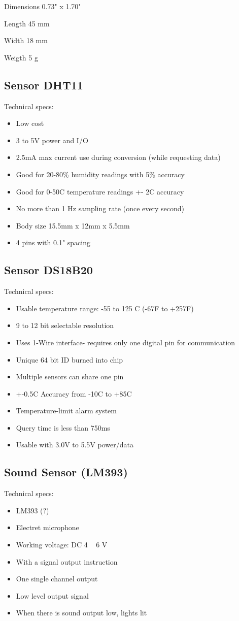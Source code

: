 \documentclass[12pt]{report}
\begin{document}
\begin{appendices}
Dimensions	0.73" x 1.70"

Length	45 mm

Width	18 mm

Weigth	5 g

\subsection{Sensor DHT11}
Technical specs:
\begin{itemize}
\item Low cost
\item  3 to 5V power and I/O
\item   2.5mA max current use during conversion (while requesting data)
\item  Good for 20-80\% humidity readings with 5\% accuracy
 \item   Good for 0-50C temperature readings +- 2C accuracy
 \item   No more than 1 Hz sampling rate (once every second)
 \item   Body size 15.5mm x 12mm x 5.5mm
 \item   4 pins with 0.1" spacing

    \end{itemize}

\subsection{Sensor DS18B20}
Technical specs:
\begin{itemize}
\item Usable temperature range: -55 to 125 C (-67F to +257F)
\item 9 to 12 bit selectable resolution
\item Uses 1-Wire interface- requires only one digital pin for communication
\item Unique 64 bit ID burned into chip
\item Multiple sensors can share one pin
\item +-0.5C Accuracy from -10C to +85C
\item Temperature-limit alarm system
\item Query time is less than 750ms
\item Usable with 3.0V to 5.5V power/data
\end{itemize}
\subsection{Sound Sensor (LM393)}
Technical specs:
\begin{itemize}
\item LM393 (?)
\item Electret microphone
\item Working voltage: DC 4 ~ 6 V
\item With a signal output instruction
\item One single channel output
\item Low level output signal
\item When there is sound output low, lights lit
\end{itemize}

\end{appendices}
\end{document}

